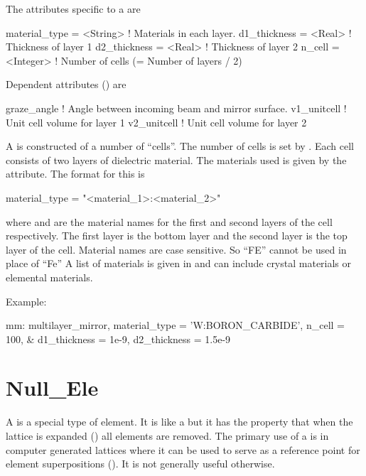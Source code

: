 {
The attributes specific to a  are 
\begin{example}
  material_type        = <String>  ! Materials in each layer.
  d1_thickness         = <Real>    ! Thickness of layer 1
  d2_thickness         = <Real>    ! Thickness of layer 2
  n_cell               = <Integer> ! Number of cells (= Number of layers / 2)
\end{example}

Dependent attributes () are
\begin{example}
  graze_angle      ! Angle between incoming beam and mirror surface.
  v1_unitcell      ! Unit cell volume for layer 1
  v2_unitcell      ! Unit cell volume for layer 2 
\end{example}

A  is constructed of a number of ``cells''. The
number of cells is set by . Each cell consists of two
layers of dielectric material. The materials used is given by
the  attribute. The format for this is
\begin{example}
  material_type = "<material_1>:<material_2>"
\end{example}
where  and  are the material names
for the first and second layers of the cell respectively. The first
layer is the bottom layer and the second layer is the top layer of the
cell.  Material names are case sensitive. So ``FE'' cannot be used in
place of ``Fe'' A list of materials is given in 
and can include crystal materials or elemental materials.

Example:
\begin{example}
  mm: multilayer_mirror, material_type = 'W:BORON_CARBIDE', n_cell = 100, &
            d1_thickness = 1e-9, d2_thickness = 1.5e-9
\end{example}

\section{Null_Ele}
\label{s:null.ele}

A  is a special type of element. It is like a 
but it has the property that when the lattice is expanded
() all  elements are removed. The
primary use of a  is in computer generated lattices where
it can be used to serve as a reference point for element
superpositions (). It is not generally useful otherwise.

}
